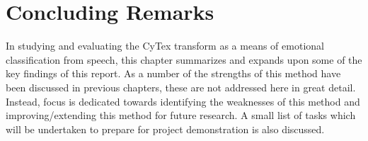 \chapter{Concluding Remarks}\label{ch-concl}
In studying and evaluating the CyTex transform as a means of emotional classification from speech, this chapter summarizes and expands upon some of the key findings of this report. As a number of the strengths of this method have been discussed in previous chapters, these are not addressed here in great detail. Instead, focus is dedicated towards identifying the weaknesses of this method and improving/extending this method for future research. A small list of tasks which will be undertaken to prepare for project demonstration is also discussed.



